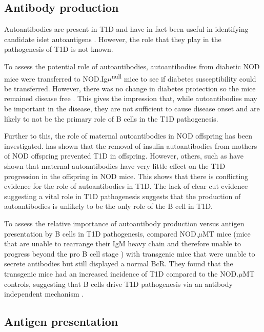 \subsection{Antibody production}

Autoantibodies are present in T1D and have in fact been useful in identifying candidate islet autoantigens \citep{Roep2012}.
However, the role that they play in the pathogenesis of T1D is not known.

To assess the potential role of autoantibodies, autoantibodies from diabetic NOD mice were transferred to NOD.Ig$\mu$\textsuperscript{null} mice to see if diabetes susceptibility could be transferred.
However, there was no change in diabetes protection so the mice remained disease free \citep{Serreze1998}.
This gives the impression that, while autoantibodies may be important in the disease, they are not sufficient to cause disease onset and are likely to not be the primary role of B cells in the T1D pathogenesis.

Further to this, the role of maternal autoantibodies in NOD offspring has been investigated.
\citet{Greeley2002} has shown that the removal of insulin autoantibodies from mothers of NOD offspring prevented T1D in offspring.
However, others, such as \citet{Koczwara2004nods} have shown that maternal autoantibodies have very little effect on the T1D progression in the offspring in NOD mice.
This shows that there is conflicting evidence for the role of autoantibodies in T1D.
The lack of clear cut evidence suggesting a vital role in T1D pathogenesis suggests that the production of autoantibodies is unlikely to be the only role of the B cell in T1D.

To assess the relative importance of autoantibody production versus antigen presentation by B cells in T1D pathogenesis, \citet{Wong2004} compared NOD.$\mu$MT mice (mice that are unable to rearrange their IgM heavy chain and therefore unable to progress beyond the pro B cell stage \citep{Kitamura1991}) with transgenic mice that were unable to secrete antibodies but still displayed a normal BcR.
They found that the transgenic mice had an increased incidence of T1D compared to the NOD.$\mu$MT controls, suggesting that B cells drive T1D pathogenesis via an antibody independent mechanism \citep{Wong2004}.



\subsection{Antigen presentation}


